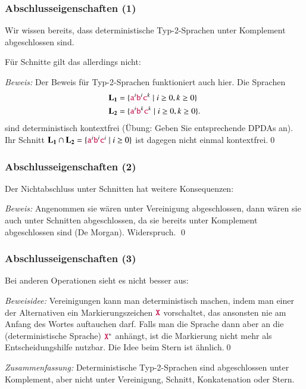 \documentclass[onlymath]{beamer}
\begin{document}
\begin{frame}\frametitle{Abschlusseigenschaften (1)}

Wir wissen bereits, dass deterministische Typ-2-Sprachen unter Komplement abgeschlossen sind.
\medskip\pause

Für Schnitte gilt das allerdings nicht:
\medskip

\pause

\emph{Beweis:} Der Beweis für Typ-2-Sprachen funktioniert auch hier.
Die Sprachen
\begin{align*}
\textbf{\textcolor{black}{L}}_{\textbf{\textcolor{black}{1}}}&= \{\mathtt{\textcolor{purple}{a}}^i\mathtt{\textcolor{purple}{b}}^i\mathtt{\textcolor{purple}{c}}^k\mid i\geq 0, k\geq 0\}\\
\textbf{\textcolor{black}{L}}_{\textbf{\textcolor{black}{2}}}&= \{\mathtt{\textcolor{purple}{a}}^i\mathtt{\textcolor{purple}{b}}^k\mathtt{\textcolor{purple}{c}}^k\mid i\geq 0, k\geq 0\}.
\end{align*}
sind deterministisch kontextfrei (Übung: Geben Sie entsprechende DPDAs an). Ihr Schnitt $\textbf{\textcolor{black}{L}}_{\textbf{\textcolor{black}{1}}}\cap\textbf{\textcolor{black}{L}}_{\textbf{\textcolor{black}{2}}}=\{\mathtt{\textcolor{purple}{a}}^i\mathtt{\textcolor{purple}{b}}^i\mathtt{\textcolor{purple}{c}}^i\mid i\geq 0\}$ ist dagegen nicht einmal kontextfrei.\qed

\end{frame}

\begin{frame}\frametitle{Abschlusseigenschaften (2)}

Der Nichtabschluss unter Schnitten hat weitere Konsequenzen:\medskip

\pause

\emph{Beweis:} Angenommen sie wären unter Vereinigung abgeschlossen, dann
wären sie auch unter Schnitten abgeschlossen, da sie bereits unter Komplement abgeschlossen sind (De Morgan).
Widerspruch.
\qed

\end{frame}

\begin{frame}\frametitle{Abschlusseigenschaften (3)}

Bei anderen Operationen sieht es nicht besser aus:\medskip

\pause

\emph{Beweisidee:} Vereinigungen kann man deterministisch machen, indem man einer der Alternativen ein Markierungszeichen $\mathtt{\textcolor{purple}{X}}$ vorschaltet, das ansonsten nie am Anfang des Wortes auftauchen darf. Falls man die Sprache dann aber an die (deterministische Sprache) $\mathtt{\textcolor{purple}{X}}^*$ anhängt, ist die Markierung nicht mehr als Entscheidungshilfe nutzbar.
Die Idee beim Stern ist ähnlich.\qed
\bigskip

\emph{Zusammenfassung:} Deterministische Typ-2-Sprachen sind 
abgeschlossen unter Komplement, aber nicht unter Vereinigung, Schnitt, Konkatenation oder Stern.

\end{frame}
\end{document}
